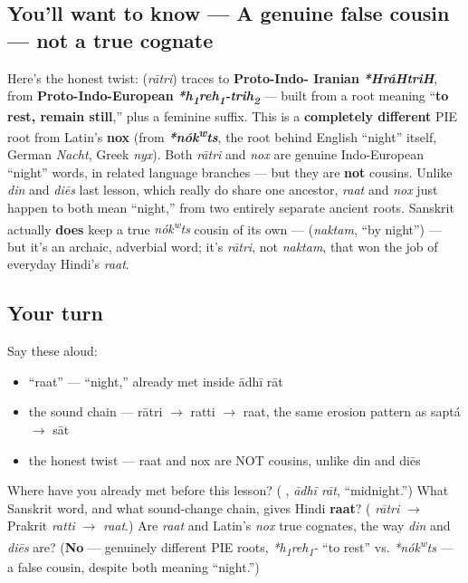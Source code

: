 \subsection*{You'll want to know — A genuine false cousin — not a true cognate}
Here's the honest twist: \textbf{} (\emph{rātri}) traces to \textbf{Proto-Indo- Iranian} \emph{\textbf{*HráHtriH}}, from \textbf{Proto-Indo-European} \emph{\textbf{*h\textsubscript{1}reh\textsubscript{1}-trih\textsubscript{2}}} — built from a root meaning \textquotedblleft{}\textbf{to rest, remain still},\textquotedblright{} plus a feminine suffix. This is a \textbf{completely different} PIE root from Latin's \textbf{nox} (from \emph{\textbf{*nók\textsuperscript{w}ts}}, the root behind English \textquotedblleft{}night\textquotedblright{} itself, German \emph{Nacht}, Greek \emph{nyx}). Both \emph{rātri} and \emph{nox} are genuine Indo-European \textquotedblleft{}night\textquotedblright{} words, in related language branches — but they are \textbf{not} cousins. Unlike \emph{din} and \emph{diēs} last lesson, which really do share one ancestor, \emph{raat} and \emph{nox} just happen to both mean \textquotedblleft{}night,\textquotedblright{} from two entirely separate ancient roots. Sanskrit actually \textbf{does} keep a true \emph{nók\textsuperscript{w}ts} cousin of its own — \textbf{} (\emph{naktam}, \textquotedblleft{}by night\textquotedblright{}) — but it's an archaic, adverbial word; it's \emph{rātri}, not \emph{naktam}, that won the job of everyday Hindi's \emph{raat}.

\subsection*{Your turn}
Say these aloud:

\begin{itemize}
\raggedright
  \item \textquotedblleft{}raat\textquotedblright{} — \textquotedblleft{}night,\textquotedblright{} already met inside ādhī rāt
  \item the sound chain — rātri $\to$ ratti $\to$ raat, the same erosion pattern as saptá $\to$ sāt
  \item the honest twist — raat and nox are NOT cousins, unlike din and diēs
\end{itemize}

\begin{tcolorbox}[breakable,colback=teal!4,colframe=teal!35!black,title={Before you move on}]
Where have you already met \textbf{} before this lesson? (\textbf{ }, \emph{ādhī rāt}, \textquotedblleft{}midnight.\textquotedblright{}) What Sanskrit word, and what sound-change chain, gives Hindi \textbf{raat}? (\textbf{} \emph{rātri} $\to$ Prakrit \emph{ratti} $\to$ \emph{raat}.) Are \emph{raat} and Latin's \emph{nox} true cognates, the way \emph{din} and \emph{diēs} are? (\textbf{No} — genuinely different PIE roots, \emph{*h\textsubscript{1}reh\textsubscript{1}-} \textquotedblleft{}to rest\textquotedblright{} vs. \emph{*nók\textsuperscript{w}ts} — a false cousin, despite both meaning \textquotedblleft{}night.\textquotedblright{})
\end{tcolorbox}
